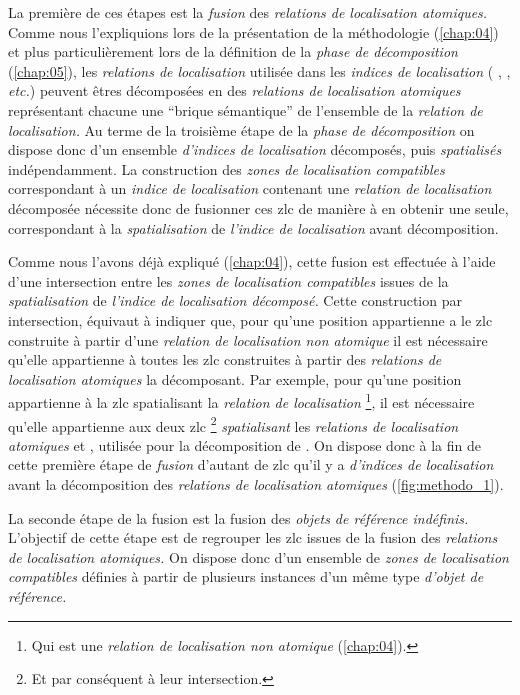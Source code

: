 La première de ces étapes est la \emph{fusion} des \emph{relations de
  localisation atomiques.} Comme nous l'expliquions lors de la
présentation de la méthodologie (\autoref{chap:04}) et plus
particulièrement lors de la définition de la \emph{phase de
  décomposition} (\autoref{chap:05}), les \emph{relations de
  localisation} utilisée dans les \emph{indices de localisation} (\eg
{}, , \emph{etc.})
peuvent êtres décomposées en des \emph{relations de localisation
  atomiques} représentant chacune une \enquote{brique sémantique} de
l'ensemble de la \emph{relation de localisation.} Au terme de la
troisième étape de la \emph{phase de décomposition} on dispose donc
d'un ensemble \emph{d'indices de localisation} décomposés, puis
\emph{spatialisés} indépendamment. La construction des \emph{zones de
  localisation compatibles} correspondant à un \emph{indice de
  localisation} contenant une \emph{relation de localisation}
décomposée nécessite donc de fusionner ces \ac{zlc} de manière à en
obtenir une seule, correspondant à la \emph{spatialisation} de
\emph{l'indice de localisation} avant décomposition.

Comme nous l'avons déjà expliqué (\autoref{chap:04}), cette fusion est
effectuée à l'aide d'une intersection entre les \emph{zones de
  localisation compatibles} issues de la \emph{spatialisation} de
\emph{l'indice de localisation décomposé.} Cette construction par
intersection, équivaut à indiquer que, pour qu'une position
appartienne a le \ac{zlc} construite à partir d'une \emph{relation de
  localisation non atomique} il est nécessaire qu'elle appartienne à
toutes les \ac{zlc} construites à partir des \emph{relations de
  localisation atomiques} la décomposant. Par exemple, pour qu'une
position appartienne à la \ac{zlc} spatialisant la \emph{relation de
  localisation}  \footnote{Qui est une
  \emph{relation de localisation non atomique} (\autoref{chap:04}).},
il est nécessaire qu'elle appartienne aux deux \ac{zlc} \footnote{Et
  par conséquent à leur intersection.} \emph{spatialisant} les
\emph{relations de localisation atomiques} 
et , utilisée pour la décomposition de
.
%
On dispose donc à la fin de cette première étape de \emph{fusion}
d'autant de \ac{zlc} qu'il y a \emph{d'indices de localisation} avant
la décomposition des \emph{relations de localisation atomiques}
(\autoref{fig:methodo_1}).

La seconde étape de la fusion est la fusion des \emph{objets de
  référence indéfinis.} L'objectif de cette étape est de regrouper les
\ac{zlc} issues de la fusion des \emph{relations de localisation
  atomiques.} On dispose donc d'un ensemble de \emph{zones de
  localisation compatibles} définies à partir de plusieurs instances
d'un même type \emph{d'objet de référence.}


